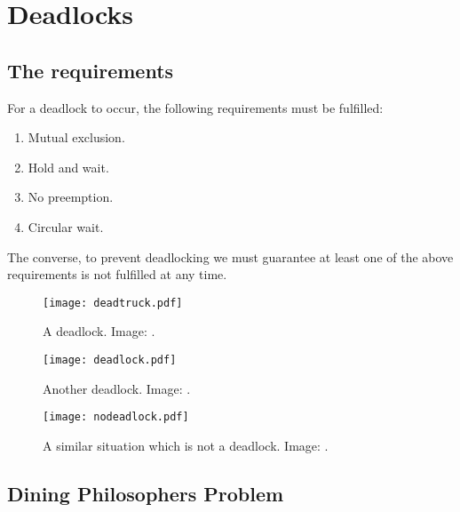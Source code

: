\documentclass{beamer}
\begin{document}
\section{Deadlocks}

\subsection{The requirements}

\begin{frame}{\insertsubsectionhead}
  For a deadlock to occur, the following requirements must be fulfilled:
  \begin{enumerate}
    \item Mutual exclusion.
    \item Hold and wait.
    \item No preemption.
    \item Circular wait.
  \end{enumerate}
  The converse, to prevent deadlocking we must guarantee at least one of the 
  above requirements is not fulfilled at any time.
\end{frame}

\begin{frame}{\insertsubsectionhead}
  \begin{figure}
    \texttt{[image: deadtruck.pdf]}
    \caption{A deadlock.
      Image: \cite{Silberschatz2013osc}.}
  \end{figure}
\end{frame}

\begin{frame}{\insertsubsectionhead}
  \begin{figure}
    \texttt{[image: deadlock.pdf]}
    \caption{Another deadlock.
      Image: \cite{Silberschatz2013osc}.}
  \end{figure}
\end{frame}

\begin{frame}{\insertsubsectionhead}
  \begin{figure}
    \texttt{[image: nodeadlock.pdf]}
    \caption{A similar situation which is not a deadlock.
      Image: \cite{Silberschatz2013osc}.}
  \end{figure}
\end{frame}

\subsection{Dining Philosophers Problem}
\end{document}
